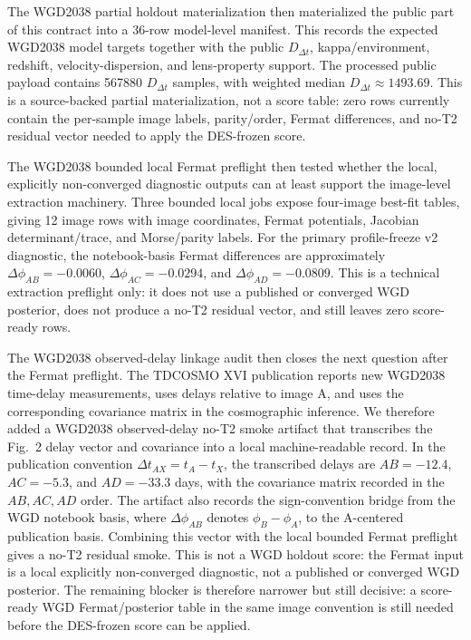 \documentclass[11pt]{article}
\begin{document}
The WGD2038 partial holdout materialization then materialized the public part
of this contract into a 36-row model-level manifest. This records the expected
WGD2038 model targets together with the public \(D_{\Delta t}\),
kappa/environment, redshift, velocity-dispersion, and lens-property support.
The processed public payload contains 567880 \(D_{\Delta t}\) samples, with
weighted median \(D_{\Delta t}\approx1493.69\). This is a source-backed partial
materialization, not a score table: zero rows currently contain the per-sample
image labels, parity/order, Fermat differences, and no-T2 residual vector
needed to apply the DES-frozen score.

The WGD2038 bounded local Fermat preflight then tested whether the local,
explicitly non-converged diagnostic outputs can at least support the image-level
extraction machinery. Three bounded local jobs expose four-image best-fit
tables, giving 12 image rows with image coordinates, Fermat potentials,
Jacobian determinant/trace, and Morse/parity labels. For the primary
profile-freeze v2 diagnostic, the notebook-basis Fermat differences are
approximately \(\Delta\phi_{AB}=-0.0060\),
\(\Delta\phi_{AC}=-0.0294\), and \(\Delta\phi_{AD}=-0.0809\). This is a
technical extraction preflight only: it does not use a published or converged
WGD posterior, does not produce a no-T2 residual vector, and still leaves zero
score-ready rows.

The WGD2038 observed-delay linkage audit then closes the next question after
the Fermat preflight. The TDCOSMO XVI publication reports new WGD2038
time-delay measurements, uses delays relative to image A, and uses the
corresponding covariance matrix in the cosmographic inference. We therefore
added a WGD2038 observed-delay no-T2 smoke artifact that transcribes the
Fig.~2 delay vector and covariance into a local machine-readable record. In
the publication convention \(\Delta t_{AX}=t_A-t_X\), the transcribed delays
are \(AB=-12.4\), \(AC=-5.3\), and \(AD=-33.3\) days, with the covariance
matrix recorded in the \(AB,AC,AD\) order. The artifact also records the
sign-convention bridge from the WGD notebook basis, where
\(\Delta\phi_{AB}\) denotes \(\phi_B-\phi_A\), to the A-centered publication
basis. Combining this vector with the local bounded Fermat preflight gives a
no-T2 residual smoke. This is not a WGD holdout score: the Fermat input is a
local explicitly non-converged diagnostic, not a published or converged WGD
posterior. The remaining blocker is therefore narrower but still decisive: a
score-ready WGD Fermat/posterior table in the same image convention is still
needed before the DES-frozen score can be applied.
\end{document}

